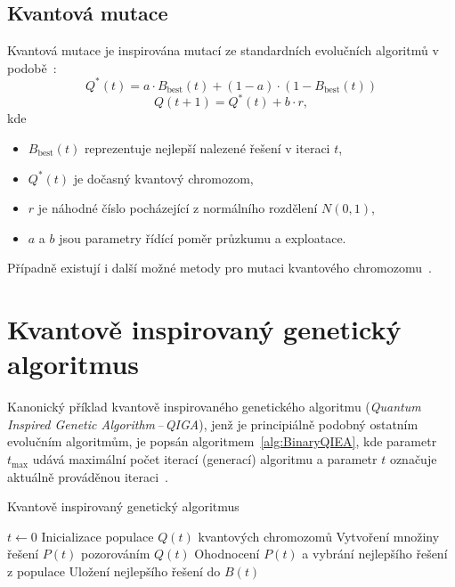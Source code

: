 \subsection{Kvantová mutace}\label{subsec:quantum-mutation}
Kvantová mutace je inspirována mutací ze standardních evolučních algoritmů v podobě~\cite{NaturalComputing}:
\begin{equation*}
    Q^*\left(t\right) = a \cdot B_{\text{best}}\left(t\right) + (1 - a) \cdot (1 - B_{\text{best}}\left(t\right))
\end{equation*}
\begin{equation*}
    Q\left(t+1\right) = Q^*\left(t\right) + b \cdot r,
\end{equation*}
kde
\begin{itemize}
    \item $B_{\text{best}}\left(t\right)$ reprezentuje nejlepší nalezené řešení v iteraci $t$,
    \item $Q^*\left(t\right)$ je dočasný kvantový chromozom,
    \item $r$ je náhodné číslo pocházející z normálního rozdělení $N\left(0,1\right)$,
    \item $a$ a $b$ jsou parametry řídící poměr průzkumu a exploatace.
\end{itemize}

Případně existují i další možné metody pro mutaci kvantového chromozomu~\cite{NaturalComputing}.

\section{Kvantově inspirovaný genetický algoritmus}\label{sec:qiga}
Kanonický příklad kvantově inspirovaného genetického algoritmu (\emph{Quantum Inspired Genetic Algorithm\,--\,QIGA}), jenž je principiálně podobný ostatním evolučním algoritmům, je popsán algoritmem~\ref{alg:BinaryQIEA}, kde parametr $t_{\text{max}}$ udává maximální počet iterací (generací) algoritmu a parametr $t$ označuje aktuálně prováděnou iteraci~\cite{NaturalComputing}. 

\begin{algorithm}[ht]
    \caption{Kvantově inspirovaný genetický algoritmus~\cite{NaturalComputing}}
    \label{alg:BinaryQIEA}
    $t \gets 0$\;
    Inicializace populace $Q\left(t\right)$ kvantových chromozomů\;
    Vytvoření množiny řešení $P\left(t\right)$ pozorováním $Q\left(t\right)$\;
    Ohodnocení $P\left(t\right)$ a vybrání nejlepšího řešení z populace\;
    Uložení nejlepšího řešení do $B\left(t\right)$\;
\end{algorithm}

